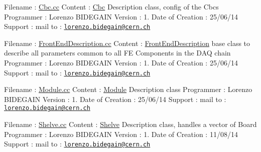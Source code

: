 Filename \-: \hyperlink{_cbc_8cc}{Cbc.\-cc} Content \-: \hyperlink{class_ph2___hw_description_1_1_cbc}{Cbc} Description class, config of the Cbcs Programmer \-: Lorenzo B\-I\-D\-E\-G\-A\-I\-N Version \-: 1. Date of Creation \-: 25/06/14 Support \-: mail to \-: \href{mailto:lorenzo.bidegain@cern.ch}{\tt lorenzo.\-bidegain@cern.\-ch}

Filename \-: \hyperlink{_front_end_description_8cc}{Front\-End\-Description.\-cc} Content \-: \hyperlink{class_ph2___hw_description_1_1_front_end_description}{Front\-End\-Description} base class to describe all parameters common to all F\-E Components in the D\-A\-Q chain Programmer \-: Lorenzo B\-I\-D\-E\-G\-A\-I\-N Version \-: 1. Date of Creation \-: 25/06/14 Support \-: mail to \-: \href{mailto:lorenzo.bidegain@cern.ch}{\tt lorenzo.\-bidegain@cern.\-ch}

Filename \-: \hyperlink{_module_8cc}{Module.\-cc} Content \-: \hyperlink{class_ph2___hw_description_1_1_module}{Module} Description class Programmer \-: Lorenzo B\-I\-D\-E\-G\-A\-I\-N Version \-: 1. Date of Creation \-: 25/06/14 Support \-: mail to \-: \href{mailto:lorenzo.bidegain@cern.ch}{\tt lorenzo.\-bidegain@cern.\-ch}

Filename \-: \hyperlink{_shelve_8cc}{Shelve.\-cc} Content \-: \hyperlink{class_ph2___hw_description_1_1_shelve}{Shelve} Description class, handles a vector of Board Programmer \-: Lorenzo B\-I\-D\-E\-G\-A\-I\-N Version \-: 1. Date of Creation \-: 11/08/14 Support \-: mail to \-: \href{mailto:lorenzo.bidegain@cern.ch}{\tt lorenzo.\-bidegain@cern.\-ch} 

